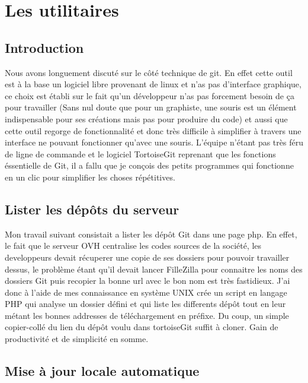 \chapter{Les utilitaires}

\section{Introduction} %

Nous avons longuement discuté sur le côté technique de git. En effet cette
outil est à la base un logiciel libre provenant de linux et n'as pas
d'interface graphique, ce choix est établi sur le fait qu'un développeur n'as
pas forcement besoin de ça pour travailler (Sans nul doute que pour un
graphiste, une souris est un élément indispensable pour ses créations mais pas
pour produire du code) et aussi que cette outil regorge de fonctionnalité et
donc très difficile à simplifier à travers une interface ne pouvant fonctionner
qu'avec une souris. L'équipe n'étant pas très féru de ligne de commande et le
logiciel TortoiseGit reprenant que les fonctions éssentielle de Git, il a fallu
que je conçois des petits programmes qui fonctionne en un clic pour simplifier
les choses répétitives.


\section{Lister les dépôts du serveur}

Mon travail suivant consistait a lister les dépôt Git dans une page php. En
effet, le fait que le serveur OVH centralise les codes sources de la société,
les developpeurs devait récuperer une copie de ses dossiers pour pouvoir
travailler dessus, le problème étant qu'il devait lancer FilleZilla pour
connaitre les noms des dossiers Git puis recopier la bonne url avec le bon nom
est très fastidieux. J'ai donc à l'aide de mes connaissance en système UNIX
crée un script en langage PHP qui analyse un dossier défini et qui liste les
differents dépôt tout en leur métant les bonnes addresses de téléchargement en
préfixe. Du coup, un simple copier-collé du lien du dépôt voulu dans
tortoiseGit suffit à cloner. Gain de productivité et de simplicité en somme.

\section{Mise à jour locale automatique} %

